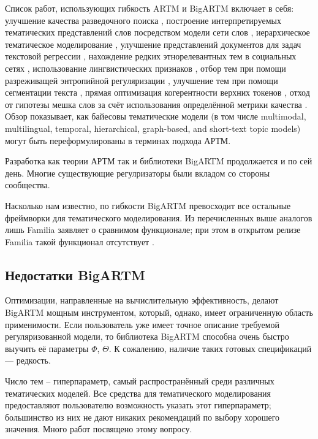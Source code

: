 Список работ, использующих гибкость ARTM и BigARTM включает в себя: улучшение качества разведочного поиска \cite{yanina17technews}, 
построение интерпретируемых тематических представлений слов посредством модели сети слов \cite{potapenko17interpretable}, 
иерархическое тематическое моделирование \cite{chirkova16additive}, 
улучшение представлений документов для задач текстовой регрессии \cite{sokolov15topic}, 
нахождение редких этнорелевантных тем в социальных сетях \cite{apishev16additive,apishev16mining}, 
использование лингвистических признаков \cite{popov_hier}, отбор тем при помощи разреживащей энтропийной регуляризации \cite{voron15slds}, улучшение тем при помощи сегментации текста \cite{skachkov}, 
прямая оптимизация когерентности верхних токенов \cite{4keys}, 
отход от гипотезы мешка слов за счёт использования определённой метрики качества \cite{intracoh}. 
Обзор \cite{kochedykov2017fast} показывает, как байесовы тематические модели (в том числе multimodal, multilingual, temporal, hierarchical, graph-based, and short-text topic models) могут быть переформулированы в терминах подхода АРТМ.

Разработка как теории АРТМ так и библиотеки \mbox{BigARTM} продолжается и по сей день. Многие существующие регулризаторы были вкладом со стороны сообщества.

Насколько нам известно, по гибкости BigARTM превосходит все остальные фреймворки для тематического моделирования. Из перечисленных выше аналогов лишь Familia заявляет о сравнимом функционале; при этом в открытом релизе Familia такой функционал отсутствует \cite{familia_github}.

\subsection{Недостатки BigARTM}

Оптимизации, направленные на вычислительную эффективность, делают BigARTM мощным инструментом, который, однако, имеет ограниченную область применимости. Если пользователь уже имеет точное описание требуемой регуляризованной модели, то библиотека BigARTM способна очень быстро выучить её параметры $\Phi$, $\Theta$. К сожалению, наличие таких готовых спецификаций --- редкость.

Число тем -- гиперпараметр, самый распространённый среди различных тематических моделей. Все средства для тематического моделирования предоставляют пользователю возможность указать этот гиперпараметр; большинство из них не дают никаких рекомендаций по выбору хорошего значения. Много работ посвящено этому вопросу.

